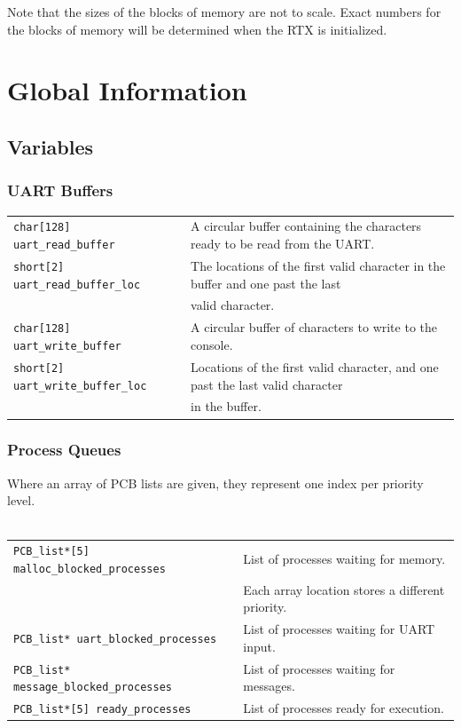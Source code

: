 \documentclass[titlepage]{article}
\begin{document}
Note that the sizes of the blocks of memory are not to scale. Exact numbers for
the blocks of memory will be determined when the RTX is initialized.

\section{Global Information}

\subsection{Variables}

\subsubsection{UART Buffers}
\begin{tabular}{ll}
\verb!char[128] uart_read_buffer!     & A circular buffer containing the characters ready to be read from the UART.\\
\verb!short[2] uart_read_buffer_loc!  & The locations of the first valid character in the buffer and one past the last\\
                                      & valid character.\\
\verb!char[128] uart_write_buffer!    & A circular buffer of characters to write to the console.\\
\verb!short[2] uart_write_buffer_loc! & Locations of the first valid character, and one past the last valid character\\
                                      & in the buffer.
\end{tabular}

\subsubsection{Process Queues}
Where an array of PCB lists are given, they represent one index per priority
level.\\\\
\begin{tabular}{ll}
\verb!PCB_list*[5] malloc_blocked_processes! & List of processes waiting for memory.            \\
                                             & Each array location stores a different priority. \\
\verb!PCB_list* uart_blocked_processes!      & List of processes waiting for UART input.       \\
\verb!PCB_list* message_blocked_processes!   & List of processes waiting for messages. \\
\verb!PCB_list*[5] ready_processes!          & List of processes ready for execution.
\end{tabular}
\end{document}
